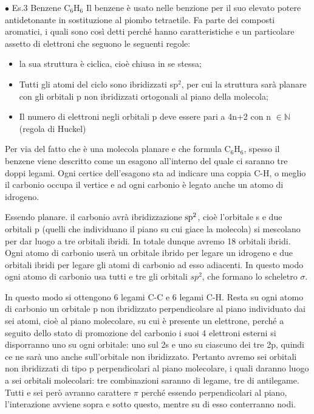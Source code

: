 \vspace{0.2cm}$\bullet$ Es.3 Benzene C$_6$H$_6$
Il benzene è usato nelle benzione per il suo elevato potere antidetonante in sostituzione al piombo tetraetile. Fa parte dei composti aromatici, i quali sono così detti perché hanno caratteristiche e un particolare assetto di elettroni che seguono le seguenti regole:

\begin{itemize}
    \item la sua struttura è ciclica, cioè chiusa in se stessa;
    \item Tutti gli atomi del ciclo sono ibridizzati sp$^2$, per cui la struttura sarà planare con gli orbitali p non ibridizzati ortogonali al piano della molecola;
    \item Il numero di elettroni negli orbitali p deve essere pari a 4n+2 con n $\in \mathbb{N}$ (regola di Huckel)
\end{itemize}

Per via del fatto che è una molecola planare e che formula C$_6$H$_6$, spesso il benzene viene descritto come un esagono all'interno del quale ci saranno tre doppi legami. Ogni certice dell'esagono sta ad indicare una coppia C-H, o meglio il carbonio occupa il vertice e ad ogni carbonio è legato anche un atomo di idrogeno.

Essendo planare. il carbonio avrà ibridizzazione $\rm sp^2$, cioè l'orbitale s e due orbitali p (quelli che individuano il piano su cui giace la molecola) si mescolano per dar luogo a tre orbitali ibridi. In totale dunque avremo 18 orbitali ibridi. Ogni atomo di carbonio userà un orbitale ibrido per legare un idrogeno e due orbitali ibridi per legare gli atomi di carbonio ad esso adiacenti. In questo modo ogni atomo di carbonio usa tutti e tre gli orbitali $sp^2$, che formano lo scheletro $\sigma$.

In questo modo si ottengono 6 legami C-C e 6 legami C-H. Resta su ogni atomo di carbonio un orbitale p non ibridizzato perpendicolare al piano individuato dai sei atomi, cioè al piano molecolare, su cui è presente un elettrone, perché a seguito dello stato di promozione del carbonio i suoi 4 elettroni esterni si disporranno uno su ogni orbitale: uno sul 2s e uno su ciascuno dei tre 2p, quindi ce ne sarà uno anche sull'orbitale non ibridizzato. Pertanto avremo sei orbitali non ibridizzati di tipo p perpendicolari al piano molecolare, i quali daranno luogo a sei orbitali molecolari: tre combinazioni saranno di legame, tre di antilegame. Tutti e sei però avranno carattere $\pi$ perché essendo perpendicolari al piano, l'interazione avviene sopra e sotto questo, mentre su di esso conterranno nodi.

